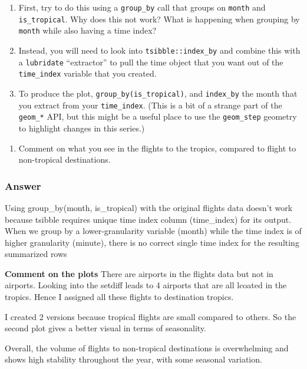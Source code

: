 \documentclass[
]{article}
\providecommand{\tightlist}{%
  \setlength{\itemsep}{0pt}\setlength{\parskip}{0pt}}
\begin{document}
\begin{enumerate}
\def\labelenumi{\alph{enumi}.}
\tightlist
\item
  First, try to do this using a \texttt{group\_by} call that groups on
  \texttt{month} and \texttt{is\_tropical}. Why does this not work? What
  is happening when grouping by \texttt{month} while also having a time
  index?
\item
  Instead, you will need to look into \texttt{tsibble::index\_by} and
  combine this with a \texttt{lubridate} ``extractor'' to pull the time
  object that you want out of the \texttt{time\_index} variable that you
  created.
\item
  To produce the plot, \texttt{group\_by(is\_tropical)}, and
  \texttt{index\_by} the month that you extract from your
  \texttt{time\_index}. (This is a bit of a strange part of the
  \texttt{geom\_*} API, but this might be a useful place to use the
  \texttt{geom\_step} geometry to highlight changes in this series.)
\end{enumerate}

\begin{enumerate}
\def\labelenumi{\arabic{enumi}.}
\setcounter{enumi}{3}
\tightlist
\item
  Comment on what you see in the flights to the tropics, compared to
  flight to non-tropical destinations.
\end{enumerate}

\subsubsection{Answer}\label{answer-2}

Using group\_by(month, is\_tropical) with the original flights data
doesn't work because tsibble requires unique time index column
(time\_index) for its output. When we group by a lower-granularity
variable (month) while the time index is of higher granularity (minute),
there is no correct single time index for the resulting summarized rows

\textbf{Comment on the plots} There are airports in the flights data but
not in airports. Looking into the setdiff leads to 4 airports that are
all lcoated in the tropics. Hence I assigned all these flights to
destination tropics.

I created 2 versions because tropical flights are small compared to
others. So the second plot gives a better visual in terms of
seasonality.

Overall, the volume of flights to non-tropical destinations is
overwhelming and shows high stability throughout the year, with some
seasonal variation.
\end{document}
